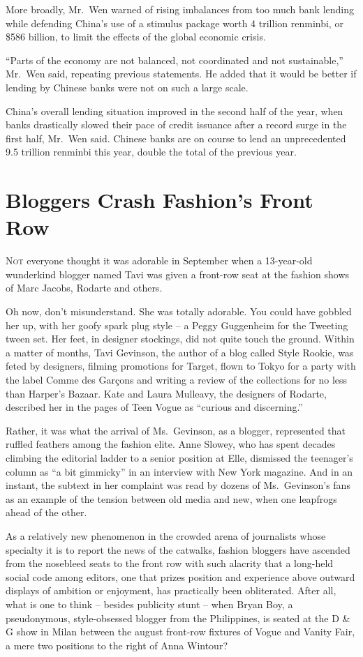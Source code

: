 ﻿\documentclass[12pt]{article}
\begin{document}
More broadly, Mr.~Wen warned of rising imbalances from too much bank lending while defending China's
use of a stimulus package worth 4 trillion renminbi, or \$586 billion, to limit the effects of the
global economic crisis.

``Parts of the economy are not balanced, not coordinated and not sustainable,'' Mr.~Wen said,
repeating previous statements. He added that it would be better if lending by Chinese banks were not
on such a large scale.

China's overall lending situation improved in the second half of the year, when banks drastically
slowed their pace of credit issuance after a record surge in the first half, Mr.~Wen said. Chinese
banks are on course to lend an unprecedented 9.5 trillion renminbi this year, double the total of
the previous year.

\section{Bloggers Crash Fashion's Front Row}

\lettrine{N}{ot} everyone thought it was adorable in September when a
13-year-old wunderkind blogger named Tavi was given a front-row seat at the fashion shows of Marc
Jacobs, Rodarte and others.

Oh now, don't misunderstand. She was totally adorable. You could have gobbled her up, with her goofy
spark plug style -- a Peggy Guggenheim for the Tweeting tween set. Her feet, in designer stockings,
did not quite touch the ground. Within a matter of months, Tavi Gevinson, the author of a blog
called Style Rookie, was feted by designers, filming promotions for Target, flown to Tokyo for a
party with the label Comme des Garçons and writing a review of the collections for no less than
Harper's Bazaar. Kate and Laura Mulleavy, the designers of Rodarte, described her in the pages of
Teen Vogue as ``curious and discerning.''

Rather, it was what the arrival of Ms.~Gevinson, as a blogger, represented that ruffled feathers
among the fashion elite. Anne Slowey, who has spent decades climbing the editorial ladder to a
senior position at Elle, dismissed the teenager's column as ``a bit gimmicky'' in an interview with
New York magazine. And in an instant, the subtext in her complaint was read by dozens of
Ms.~Gevinson's fans as an example of the tension between old media and new, when one leapfrogs ahead
of the other.

As a relatively new phenomenon in the crowded arena of journalists whose specialty it is to report
the news of the catwalks, fashion bloggers have ascended from the nosebleed seats to the front row
with such alacrity that a long-held social code among editors, one that prizes position and
experience above outward displays of ambition or enjoyment, has practically been obliterated. After
all, what is one to think -- besides publicity stunt -- when Bryan Boy, a pseudonymous,
style-obsessed blogger from the Philippines, is seated at the D \& G show in Milan between the
august front-row fixtures of Vogue and Vanity Fair, a mere two positions to the right of Anna
Wintour?
\end{document}
